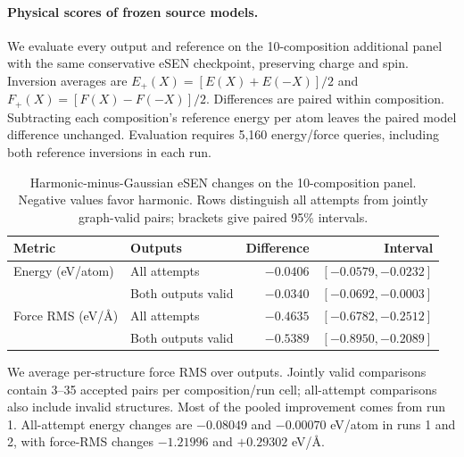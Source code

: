 \paragraph{Physical scores of frozen source models.}
We evaluate every output and reference on the 10-composition additional panel with the same conservative eSEN checkpoint, preserving charge and spin. Inversion averages are $E_+(X)=[E(X)+E(-X)]/2$ and $F_+(X)=[F(X)-F(-X)]/2$. Differences are paired within composition. Subtracting each composition's reference energy per atom leaves the paired model difference unchanged. Evaluation requires 5,160 energy/force queries, including both reference inversions in each run.

\begin{table}[t]
\centering
\caption{Harmonic-minus-Gaussian eSEN changes on the 10-composition panel. Negative values favor harmonic. Rows distinguish all attempts from jointly graph-valid pairs; brackets give paired 95\% intervals.}
\begin{tabular}{llrr}
\toprule
Metric & Outputs & Difference & Interval\\
\midrule
Energy (eV/atom) & All attempts & $-0.0406$ & $[-0.0579,-0.0232]$\\
                & Both outputs valid & $-0.0340$ & $[-0.0692,-0.0003]$\\
Force RMS (eV/\AA) & All attempts & $-0.4635$ & $[-0.6782,-0.2512]$\\
                  & Both outputs valid & $-0.5389$ & $[-0.8950,-0.2089]$\\
\bottomrule
\end{tabular}\label{tab:physical}
\end{table}

We average per-structure force RMS over outputs. Jointly valid comparisons contain 3--35 accepted pairs per composition/run cell; all-attempt comparisons also include invalid structures. Most of the pooled improvement comes from run 1. All-attempt energy changes are $-0.08049$ and $-0.00070$ eV/atom in runs 1 and 2, with force-RMS changes $-1.21996$ and $+0.29302$ eV/\AA.
